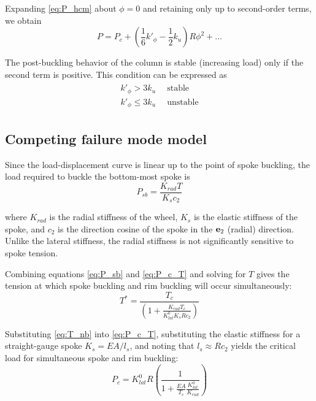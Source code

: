 \documentclass[\rootdir/thesis.tex]{subfiles}
\begin{document}
Expanding \eqref{eq:P_hcm} about $\phi=0$ and retaining only up to second-order terms, we obtain
\begin{equation}
\label{eq:P_series_hcm}
P = P_c + \left(\frac{1}{6}k'_{\phi} - \frac{1}{2}k_u\right)R\phi^2 + ...
\end{equation}

The post-buckling behavior of the column is stable (increasing load) only if the second term is positive. This condition can be expressed as
\begin{align}
\begin{split}
\label{eq:pb_stability_hcm}
k'_{\phi} > 3k_u & \,\,\,\text{stable}\\
k'_{\phi} \leq 3k_u & \,\,\,\text{unstable}
\end{split}
\end{align}


\subsection{Competing failure mode model}

Since the load-displacement curve is linear up to the point of spoke buckling, the load required to buckle the bottom-most spoke is
\begin{equation}
\label{eq:P_sb}
P_{sb} = \frac{K_{rad}T}{K_s c_2}
\end{equation}

where $K_{rad}$ is the radial stiffness of the wheel, $K_s$ is the elastic stiffness of the spoke, and $c_2$ is the direction cosine of the spoke in the $\mathbf{e}_2$ (radial) direction. Unlike the lateral stiffness, the radial stiffness is not significantly sensitive to spoke tension.

Combining equations \eqref{eq:P_sb} and \eqref{eq:P_c_T} and solving for $T$ gives the tension at which spoke buckling and rim buckling will occur simultaneously:
\begin{equation}
\label{eq:T_nb}
T^* = \frac{T_c}{\left(1 + \frac{K_{rad}T_c}{K_{lat}^0 K_s R c_2}\right)}
\end{equation}

Substituting \eqref{eq:T_nb} into \eqref{eq:P_c_T}, substituting the elastic stiffness for a straight-gauge spoke $K_s=EA/l_s$, and noting that $l_s \approx Rc_2$ yields the critical load for simultaneous spoke and rim buckling:
\begin{equation}
\label{eq:P_c_nb}
P_c = K_{lat}^0 R \left(\frac{1}{1 + \frac{EA}
						{T_c}\frac{K_{lat}^0}{K_{rad}}}\right)
\end{equation}
\end{document}

